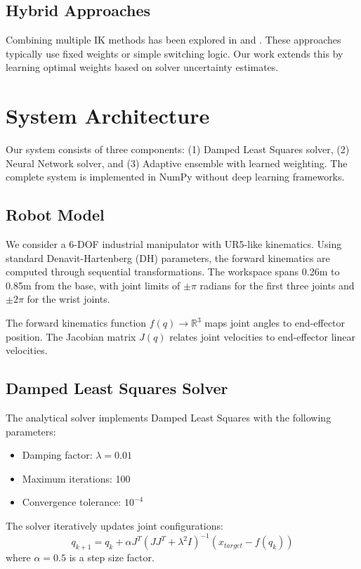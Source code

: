 {{\subsection{Hybrid Approaches}
Combining multiple IK methods has been explored in \cite{keemink2012adapting} and \cite{asenov2017ensemble}. These approaches typically use fixed weights or simple switching logic. Our work extends this by learning optimal weights based on solver uncertainty estimates.

\section{System Architecture}

Our system consists of three components: (1) Damped Least Squares solver, (2) Neural Network solver, and (3) Adaptive ensemble with learned weighting. The complete system is implemented in NumPy without deep learning frameworks.

\subsection{Robot Model}
We consider a 6-DOF industrial manipulator with UR5-like kinematics. Using standard Denavit-Hartenberg (DH) parameters, the forward kinematics are computed through sequential transformations. The workspace spans 0.26m to 0.85m from the base, with joint limits of $\pm\pi$ radians for the first three joints and $\pm2\pi$ for the wrist joints.

The forward kinematics function $f(q) \rightarrow \mathbb{R}^3$ maps joint angles to end-effector position. The Jacobian matrix $J(q)$ relates joint velocities to end-effector linear velocities.

\subsection{Damped Least Squares Solver}
The analytical solver implements Damped Least Squares with the following parameters:
\begin{itemize}
    \item Damping factor: $\lambda = 0.01$
    \item Maximum iterations: 100
    \item Convergence tolerance: $10^{-4}$
\end{itemize}
The solver iteratively updates joint configurations:
\begin{equation}
q_{k+1} = q_k + \alpha J^T (JJ^T + \lambda^2 I)^{-1} (x_{target} - f(q_k))
\end{equation}
where $\alpha = 0.5$ is a step size factor.

}}
